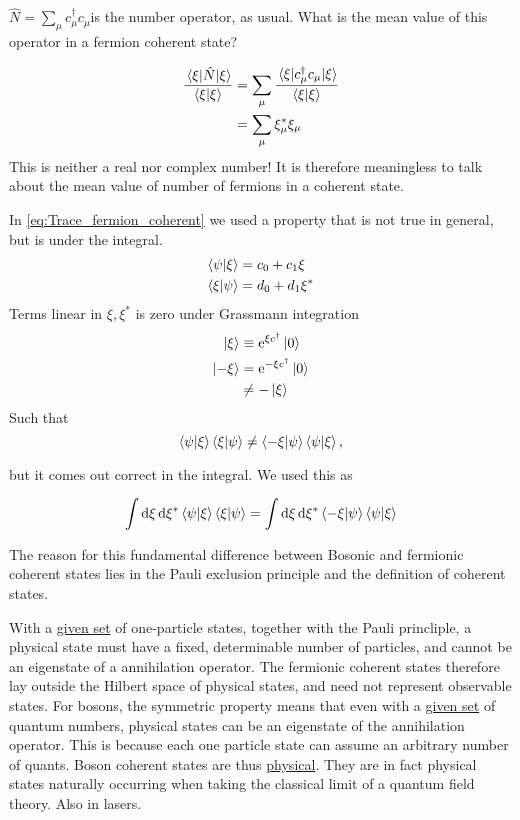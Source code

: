 \(\hat{N} = \sum_\mu c_\mu^\dagger c_\mu\)is the number operator, as usual. What is the mean value of this operator in a fermion coherent state?

\begin{align}
\frac{\ev{\hat{N}}{\xi}}{\braket{\xi}} &= \sum_\mu \frac{\ev{c_\mu^\dagger c_\mu }{\xi}}{\braket \xi} \\
&= \sum_\mu \xi_\mu^* \xi_\mu 
\end{align}
This is neither a real nor complex number! It is therefore meaningless to talk about the mean value of number of fermions in a coherent state. 

In \eqref{eq:Trace_fermion_coherent} we used a property that is not true in general, but is under the integral.
\begin{align*}
\braket{\psi}{\xi} &= c_0 + c_1\xi \\
\braket{\xi}{\psi} &= d_0 + d_1\xi^*
\end{align*}
Terms linear in \(\xi, \xi^*\) is zero under Grassmann integration
\begin{align*}
\ket \xi &\equiv \mathrm{e}^{\xi c^\dagger}\ket 0\\
\ket{-\xi} &= \mathrm{e}^{-\xi c^\dagger}\ket 0 \\
&\ne -\ket \xi
\end{align*}
Such that 
\begin{equation}
\braket{\psi}{\xi}\braket{\xi}{\psi} \ne \braket{-\xi}{\psi}\braket{\psi}{\xi},
\end{equation}

but it comes out correct in the integral. We used this as

\begin{equation}
\int\dd{\xi}\dd{\xi^*}\braket{\psi}{\xi}\braket{\xi}{\psi} = \int\dd{\xi}\dd{\xi^*}\braket{-\xi}{\psi}\braket{\psi}{\xi}
\end{equation}

The reason for this fundamental difference between Bosonic and fermionic coherent states lies in the Pauli exclusion principle and the definition of coherent states.

With a \underline{given set} of one-particle states, together with the Pauli princliple, a physical state must have a fixed, determinable number of particles, and cannot be an eigenstate of a annihilation operator. The fermionic coherent states therefore lay outside the Hilbert space of physical states, and need not represent observable states. For bosons, the symmetric property means that even with a \underline{given set} of quantum numbers, physical states can be an eigenstate of the annihilation operator. This is because each one particle state can assume an arbitrary number of quants. Boson coherent states are thus \underline{physical}. They are in fact physical states naturally occurring when taking the classical limit of a quantum field theory. Also in lasers. 

